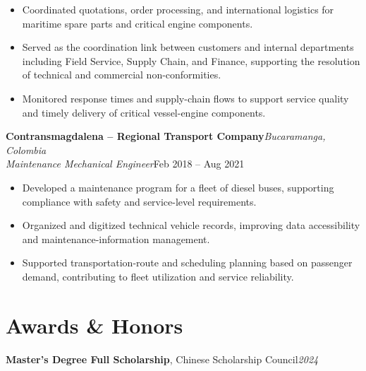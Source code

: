 \documentclass[11pt,a4paper]{article}
\newcommand{\cventry}[4]{%
	\noindent
	\textbf{#1}\hfill\textit{#2}\\
	\textit{#3}\hfill{#4}
	\par\vspace{1pt}
}
\newcommand{\cvline}[2]{%
	\noindent
	{#1}\hfill\textit{#2}
	\par\vspace{1pt}
}
\begin{document}
	\begin{itemize}
		
		\item Coordinated quotations,
		order processing,
		and international logistics
		for maritime spare parts and critical engine components.
		
		\item Served as the coordination link between customers
		and internal departments including
		Field Service,
		Supply Chain,
		and Finance,
		supporting the resolution of technical and commercial
		non-conformities.
		
		\item Monitored response times and supply-chain flows
		to support service quality and timely delivery
		of critical vessel-engine components.
		
	\end{itemize}
	
	\vspace{4pt}
	
	\cventry
	{Contransmagdalena -- Regional Transport Company}
	{Bucaramanga, Colombia}
	{Maintenance Mechanical Engineer}
	{Feb 2018 -- Aug 2021}
	
	\begin{itemize}
		
		\item Developed a maintenance program for a fleet of diesel buses,
		supporting compliance with safety and service-level requirements.
		
		\item Organized and digitized technical vehicle records,
		improving data accessibility and maintenance-information management.
		
		\item Supported transportation-route and scheduling planning
		based on passenger demand,
		contributing to fleet utilization and service reliability.
		
	\end{itemize}
	
	
	
	\section{Awards \& Honors}
	
	\cvline
	{\textbf{Master's Degree Full Scholarship},
		Chinese Scholarship Council}
	{2024}
	
\end{document}
